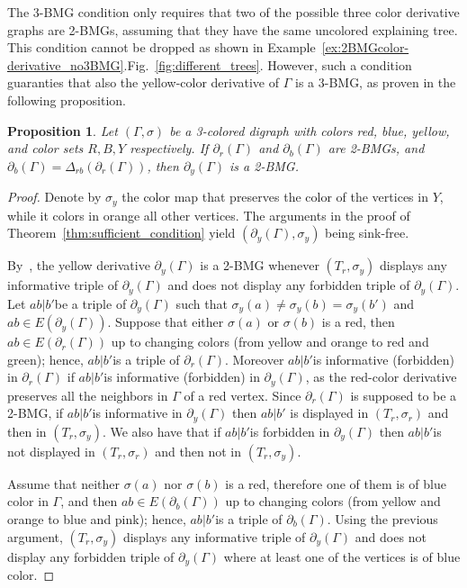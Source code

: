 \documentclass[final,3p,times]{elsarticle}
\newtheorem{proposition}[theorem]{Proposition}%
\newcommand{\OLD}[1]{\begingroup\tiny\color{gray}#1\endgroup}
\newcommand{\mh}[1]{\begingroup\color{magenta}#1\endgroup}
\begin{document}
The 3-BMG condition only requires that two of the possible three color derivative graphs are 2-BMGs, assuming that they have the same uncolored explaining tree. This condition cannot be dropped as shown in \OLD{Example~\ref{ex:2BMGcolor-derivative_no3BMG}.}\mh{Fig.\ \ref{fig:different_trees}.}
 However, such a condition guaranties that also the yellow-color derivative of $\Gamma$ is a 3-BMG, as proven in the following proposition. 

\begin{proposition}\label{prop:yellow-derv}
Let $(\Gamma,\sigma)$ be a 3-colored digraph with colors red, blue, yellow, and color sets $R,B,Y$ respectively. If $\partial_r(\Gamma)$ and $\partial_b(\Gamma)$ are 2-BMGs, and $\partial_b(\Gamma)=\Delta_{rb}(\partial_r(\Gamma))$, then $\partial_{y}(\Gamma)$ is a 2-BMG.
\end{proposition}
\begin{proof}
Denote by $\sigma_y$ the color map that preserves the color of the vertices in $Y$, while it colors in orange all other vertices.
The arguments in the proof of Theorem~\ref{thm:sufficient_condition} yield $(\partial_{y}(\Gamma),\sigma_y)$ being sink-free. 

By~\cite[Proposition~2.3]{korchmaros2021quasi}, the yellow derivative $\partial_{y}(\Gamma)$ is a 2-BMG whenever $(T_r,\sigma_y)$ displays any informative triple of $\partial_{y}(\Gamma)$ and does not display any forbidden triple of $\partial_{y}(\Gamma)$. Let $ab|b'$be a triple of $\partial_{y}(\Gamma)$ such that $\sigma_y(a)\ne \sigma_y(b)=\sigma_y(b')$ and $ab\in E(\partial_{y}(\Gamma))$. Suppose that either $\sigma(a)$ or $\sigma(b)$ is a red, then $ab\in E(\partial_{r}(\Gamma))$ up to changing colors (from yellow and orange to red and green); hence, $ab|b'$is a triple of $\partial_{r}(\Gamma)$. Moreover $ab|b'$is informative (forbidden) in $\partial_{r}(\Gamma)$ if $ab|b'$is informative (forbidden) in $\partial_{y}(\Gamma)$, as the red-color derivative preserves all the neighbors in $\Gamma$ of a red vertex. Since $\partial_{r}(\Gamma)$ is supposed to be a 2-BMG, if $ab|b'$is informative in $\partial_{y}(\Gamma)$ then $ab|b'$ is displayed in $(T_r,\sigma_r)$ and then in $(T_r,\sigma_y)$. We also have that if $ab|b'$is forbidden in $\partial_{y}(\Gamma)$ then $ab|b'$is not displayed in $(T_r,\sigma_r)$ and then not in $(T_r,\sigma_y)$.

Assume that neither $\sigma(a)$ nor $\sigma(b)$ is a red, therefore one of them is of blue color in $\Gamma$, and then $ab\in E(\partial_{b}(\Gamma))$ up to changing colors (from yellow and orange to blue and pink); hence, $ab|b'$is a triple of $\partial_{b}(\Gamma)$. Using the previous argument, $(T_r,\sigma_y)$ displays any informative triple of $\partial_{y}(\Gamma)$ and does not display any forbidden triple of $\partial_{y}(\Gamma)$ where at least one of the vertices is of blue color.
\end{proof}
\end{document}
